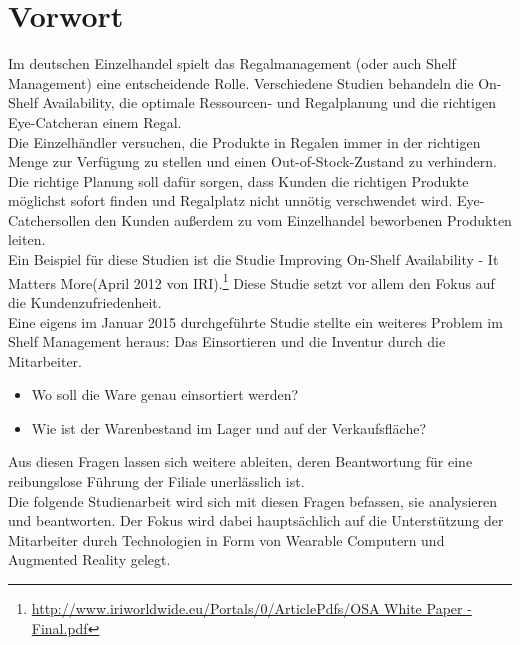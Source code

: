 \chapter{Vorwort}
\label{cha:vorwort}
Im deutschen Einzelhandel spielt das Regalmanagement (oder auch Shelf Management) eine entscheidende Rolle. Verschiedene Studien behandeln die \glqq On-Shelf Availability\grqq , die optimale Ressourcen- und Regalplanung und die richtigen \glqq Eye-Catcher\grqq an einem Regal.\\

Die Einzelhändler versuchen, die Produkte in Regalen immer in der richtigen Menge zur Verfügung zu stellen und einen \glqq Out-of-Stock\grqq -Zustand zu verhindern. Die richtige Planung soll dafür sorgen, dass Kunden die richtigen Produkte möglichst sofort finden und Regalplatz nicht unnötig verschwendet wird. \glqq Eye-Catcher\grqq sollen den Kunden außerdem zu vom Einzelhandel beworbenen Produkten leiten.\\

Ein Beispiel für diese Studien ist \zB die Studie \glqq Improving On-Shelf Availability - It Matters More\grqq (April 2012 von IRI).\footnote{\url{http://www.iriworldwide.eu/Portals/0/ArticlePdfs/OSA White Paper - Final.pdf}} Diese Studie setzt vor allem den Fokus auf die Kundenzufriedenheit.\\

Eine eigens im Januar 2015 durchgeführte Studie stellte ein weiteres Problem im Shelf Management heraus: Das Einsortieren und die Inventur durch die Mitarbeiter.
\begin{itemize}
	\item Wo soll die Ware genau einsortiert werden?
	\item Wie ist der Warenbestand im Lager und auf der Verkaufsfläche?
\end{itemize}
Aus diesen Fragen lassen sich weitere ableiten, deren Beantwortung für eine reibungslose Führung der Filiale unerlässlich ist.\\

Die folgende Studienarbeit wird sich mit diesen Fragen befassen, sie analysieren und beantworten. Der Fokus wird dabei hauptsächlich auf die Unterstützung der Mitarbeiter durch Technologien in Form von Wearable Computern und Augmented Reality gelegt.